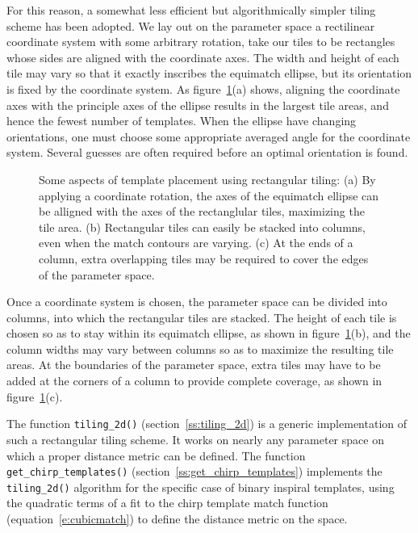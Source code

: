 For this reason, a somewhat less efficient but algorithmically simpler
tiling scheme has been adopted.  We lay out on the parameter space a
rectilinear coordinate system with some arbitrary rotation, take our
tiles to be rectangles whose sides are aligned with the coordinate
axes.  The width and height of each tile may vary so that it exactly
inscribes the equimatch ellipse, but its orientation is fixed by the
coordinate system.  As figure~\ref{f:tiling}(a) shows, aligning the
coordinate axes with the principle axes of the ellipse results in the
largest tile areas, and hence the fewest number of templates.  When
the ellipse have changing orientations, one must choose some
appropriate averaged angle for the coordinate system.  Several guesses
are often required before an optimal orientation is found.
\begin{figure}[h]
\begin{center}
\caption{ \label{f:tiling}
  Some aspects of template placement using rectangular tiling: (a) By
  applying a coordinate rotation, the axes of the equimatch ellipse
  can be alligned with the axes of the rectanglular tiles, maximizing
  the tile area.  (b) Rectangular tiles can easily be stacked into
  columns, even when the match contours are varying.  (c) At the ends
  of a column, extra overlapping tiles may be required to cover the
  edges of the parameter space. }
\end{center}
\end{figure}

Once a coordinate system is chosen, the parameter space can be divided
into columns, into which the rectangular tiles are stacked.  The
height of each tile is chosen so as to stay within its equimatch
ellipse, as shown in figure~\ref{f:tiling}(b), and the column widths
may vary between columns so as to maximize the resulting tile areas.
At the boundaries of the parameter space, extra tiles may have to be
added at the corners of a column to provide complete coverage, as
shown in figure~\ref{f:tiling}(c).

The function {\tt tiling\_2d()} (section~\ref{ss:tiling_2d}) is a
generic implementation of such a rectangular tiling scheme.  It works
on nearly any parameter space on which a proper distance metric can be
defined.  The function {\tt get\_chirp\_templates()}
(section~\ref{ss:get_chirp_templates}) implements the {\tt
tiling\_2d()} algorithm for the specific case of binary inspiral
templates, using the quadratic terms of a fit to the chirp template
match function (equation~\ref{e:cubicmatch}) to define the distance
metric on the space.



